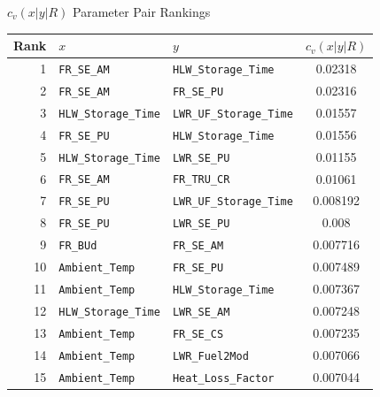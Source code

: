 \documentclass[pdf, autumn, slideColor, nocolorBG]{prosper}
\begin{document}
\begin{slide}{$c_v(x|y|R)$ Parameter Pair Rankings}
\begin{center}
\tiny
\begin{tabular}{|r|l|l|c|}
\hline
\textbf{Rank}&\textbf{$x$}&\textbf{$y$}&\textbf{$c_v(x|y|R)$}\\
\hline
1&\texttt{FR\_SE\_AM}&\texttt{HLW\_Storage\_Time}&0.02318\\
\hline
2&\texttt{FR\_SE\_AM}&\texttt{FR\_SE\_PU}&0.02316\\
\hline
3&\texttt{HLW\_Storage\_Time}&\texttt{LWR\_UF\_Storage\_Time}&0.01557\\
\hline
4&\texttt{FR\_SE\_PU}&\texttt{HLW\_Storage\_Time}&0.01556\\
\hline
5&\texttt{HLW\_Storage\_Time}&\texttt{LWR\_SE\_PU}&0.01155\\
\hline
6&\texttt{FR\_SE\_AM}&\texttt{FR\_TRU\_CR}&0.01061\\
\hline
7&\texttt{FR\_SE\_PU}&\texttt{LWR\_UF\_Storage\_Time}&0.008192\\
\hline
8&\texttt{FR\_SE\_PU}&\texttt{LWR\_SE\_PU}&0.008\\
\hline
9&\texttt{FR\_BUd}&\texttt{FR\_SE\_AM}&0.007716\\
\hline
10&\texttt{Ambient\_Temp}&\texttt{FR\_SE\_PU}&0.007489\\
\hline
11&\texttt{Ambient\_Temp}&\texttt{HLW\_Storage\_Time}&0.007367\\
\hline
12&\texttt{HLW\_Storage\_Time}&\texttt{LWR\_SE\_AM}&0.007248\\
\hline
13&\texttt{Ambient\_Temp}&\texttt{FR\_SE\_CS}&0.007235\\
\hline
14&\texttt{Ambient\_Temp}&\texttt{LWR\_Fuel2Mod}&0.007066\\
\hline
15&\texttt{Ambient\_Temp}&\texttt{Heat\_Loss\_Factor}&0.007044\\
\hline
\end{tabular}
\end{center}
\end{slide}
\end{document}
